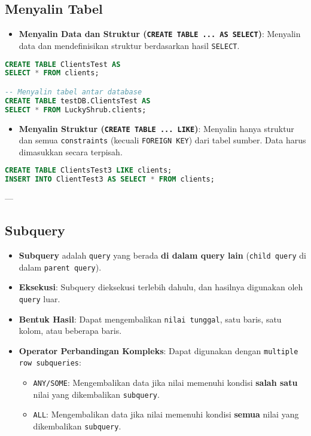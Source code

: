 \documentclass{article}
\begin{document}
\subsection{Menyalin Tabel}
\begin{itemize}
    \item \textbf{Menyalin Data dan Struktur (\texttt{CREATE TABLE ... AS SELECT})}: Menyalin data dan mendefinisikan struktur berdasarkan hasil \texttt{SELECT}.
\end{itemize}
\begin{lstlisting}[language=SQL, caption={Menyalin Tabel dengan Data}, captionpos=b]
CREATE TABLE ClientsTest AS  
SELECT * FROM clients;

-- Menyalin tabel antar database
CREATE TABLE testDB.ClientsTest AS  
SELECT * FROM LuckyShrub.clients;
\end{lstlisting}
\begin{itemize}
    \item \textbf{Menyalin Struktur (\texttt{CREATE TABLE ... LIKE})}: Menyalin hanya struktur dan semua \texttt{constraints} (kecuali \texttt{FOREIGN KEY}) dari tabel sumber. Data harus dimasukkan secara terpisah.
\end{itemize}
\begin{lstlisting}[language=SQL, caption={Menyalin Struktur Tabel dan Data}, captionpos=b]
CREATE TABLE ClientsTest3 LIKE clients;
INSERT INTO ClientTest3 AS SELECT * FROM clients;
\end{lstlisting}

---

\subsection{Subquery}
\begin{itemize}
    \item \textbf{Subquery} adalah \texttt{query} yang berada \textbf{di dalam query lain} (\texttt{child query} di dalam \texttt{parent query}).
    \item \textbf{Eksekusi}: Subquery dieksekusi terlebih dahulu, dan hasilnya digunakan oleh \texttt{query} luar.
    \item \textbf{Bentuk Hasil}: Dapat mengembalikan \texttt{nilai tunggal}, satu baris, satu kolom, atau beberapa baris.
    \item \textbf{Operator Perbandingan Kompleks}: Dapat digunakan dengan \texttt{multiple row subqueries}:
          \begin{itemize}
              \item \texttt{ANY/SOME}: Mengembalikan data jika nilai memenuhi kondisi \textbf{salah satu} nilai yang dikembalikan \texttt{subquery}.
              \item \texttt{ALL}: Mengembalikan data jika nilai memenuhi kondisi \textbf{semua} nilai yang dikembalikan \texttt{subquery}.
          \end{itemize}
\end{itemize}
\end{document}
